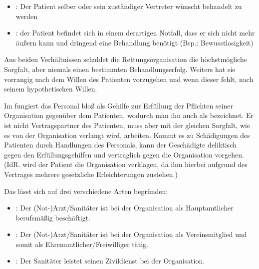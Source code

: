 \begin{itemize}
	\item {\mdseries
	: Der Patient selber oder sein
	zuständiger Vertreter	w\"unscht behandelt zu werden}

	\item {\mdseries
	: der
	Patient befindet sich in einem derartigen Notfall, dass er sich nicht mehr
	äu{\ss}ern kann und dringend eine Behandlung ben\"otigt (Bsp.:
	Bewusstlosigkeit)}

\end{itemize}

Aus beiden Verhältnissen schuldet die Rettungsorganisation die
h\"ochstm\"ogliche Sorgfalt, aber niemals einen bestimmten
Behandlungserfolg. Weiters hat sie vorrangig nach dem
Willen des Patienten vorzugehen und wenn dieser fehlt, nach
seinem hypothetischen Willen.

Im  fungiert das Personal
blo{\ss} als Gehilfe zur Erf\"ullung der Pflichten seiner Organisation gegen\"uber
dem Patienten, wodurch man ihn auch als
 bezeichnet. Er ist nicht
Vertragspartner des Patienten, muss aber mit der gleichen Sorgfalt, wie es
von der Organisation verlangt wird, arbeiten. Kommt es zu
Schädigungen des Patienten durch Handlungen des
Personals, kann der Geschädigte deliktisch gegen den
Erf\"ullungsgehilfen und vertraglich gegen die Organisation vorgehen. (IdR. wird der
Patient die Organisation verklagen, da ihm hierbei aufgrund
des Vertrages mehrere gesetzliche Erleichterungen zustehen.)

Das  lässt sich auf drei verschiedene Arten
begr\"unden:

\begin{itemize}
\item {}: Der (Not-)Arzt/Sanitäter ist bei
der Organisation als Hauptamtlicher berufsmä{\ss}ig beschäftigt. 

\item {}: Der (Not-)Arzt/Sanitäter ist
bei der Organisation als Vereinsmitglied und somit als
Ehrenamtlicher/Freiwilliger tätig. 

\item {}: Der Sanitäter leistet seinen
Zivildienst bei der Organisation.

\end{itemize}

